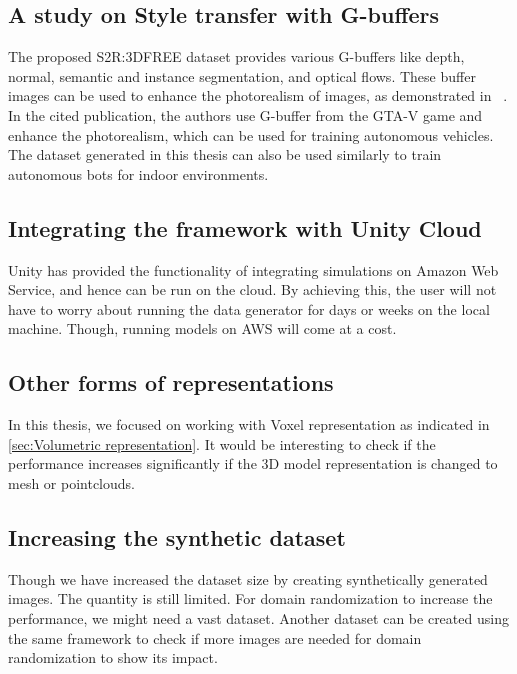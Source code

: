 \subsection{A study on Style transfer with G-buffers}
The proposed S2R:3DFREE dataset provides various G-buffers like depth, normal, semantic and instance segmentation, and optical flows.
These buffer images can be used to enhance the photorealism of images, as demonstrated in ~\cite{Richter_2021}.
In the cited publication, the authors use G-buffer from the GTA-V game and enhance the photorealism, which can be used for training autonomous vehicles.
The dataset generated in this thesis can also be used similarly to train autonomous bots for indoor environments.

\subsection{Integrating the framework with Unity Cloud}
Unity has provided the functionality of integrating simulations on Amazon Web Service, and hence can be run on the cloud.
By achieving this, the user will not have to worry about running the data generator for days or weeks on the local machine.
Though, running models on AWS will come at a cost.

\subsection{Other forms of representations}
In this thesis, we focused on working with Voxel representation as indicated in \autoref{sec:Volumetric representation}.
It would be interesting to check if the performance increases significantly if the 3D model representation is changed to mesh or pointclouds.

\subsection{Increasing the synthetic dataset}
Though we have increased the dataset size by creating synthetically generated images.
The quantity is still limited.
For domain randomization to increase the performance, we might need a vast dataset.
Another dataset can be created using the same framework to check if more images are needed for domain randomization to show its impact.


